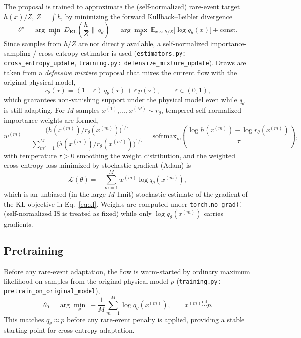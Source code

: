 \documentclass[11pt]{article}
\newcommand{\E}{\mathbb{E}}
\begin{document}
The proposal is trained to approximate the (self-normalized) rare-event
target $h(x)/Z$, $Z = \int h$, by minimizing the forward Kullback--Leibler
divergence
\begin{equation}
\theta^\star
=
\arg\min_\theta \; D_{\mathrm{KL}}\!\left(\frac{h}{Z} \,\Big\|\, q_\theta\right)
=
\arg\max_\theta \; \E_{x \sim h/Z}\big[\log q_\theta(x)\big] + \text{const.}
\label{eq:kl}
\end{equation}
Since samples from $h/Z$ are not directly available, a self-normalized
importance-sampling / cross-entropy estimator is used
(\texttt{estimators.py: cross\_entropy\_update},
\texttt{training.py: defensive\_mixture\_update}). Draws are taken from a
\emph{defensive mixture} proposal that mixes the current flow with the
original physical model,
\begin{equation}
r_\theta(x) = (1-\varepsilon)\, q_\theta(x) + \varepsilon\, p(x),
\qquad \varepsilon \in (0,1),
\label{eq:defensive-mixture}
\end{equation}
which guarantees non-vanishing support under the physical model even while
$q_\theta$ is still adapting. For $M$ samples $x^{(1)},\dots,x^{(M)} \sim
r_\theta$, tempered self-normalized importance weights are formed,
\begin{equation}
w^{(m)}
=
\frac{\big(h(x^{(m)})/r_\theta(x^{(m)})\big)^{1/\tau}}
{\sum_{m'=1}^M \big(h(x^{(m')})/r_\theta(x^{(m')})\big)^{1/\tau}}
=
\mathrm{softmax}_m\!\left(\frac{\log h(x^{(m)}) - \log r_\theta(x^{(m)})}{\tau}\right),
\label{eq:weights}
\end{equation}
with temperature $\tau > 0$ smoothing the weight distribution, and the
weighted cross-entropy loss minimized by stochastic gradient (Adam) is
\begin{equation}
\mathcal L(\theta) = -\sum_{m=1}^M w^{(m)} \log q_\theta(x^{(m)}),
\label{eq:loss}
\end{equation}
which is an unbiased (in the large-$M$ limit) stochastic estimate of the
gradient of the KL objective in Eq.~\eqref{eq:kl}. Weights are computed under
\texttt{torch.no\_grad()} (self-normalized IS is treated as fixed) while only
$\log q_\theta(x^{(m)})$ carries gradients.

\subsection{Pretraining}

Before any rare-event adaptation, the flow is warm-started by ordinary
maximum likelihood on samples from the original physical model $p$
(\texttt{training.py: pretrain\_on\_original\_model}),
\begin{equation}
\theta_0 = \arg\min_\theta \; -\frac1M \sum_{m=1}^M \log q_\theta(x^{(m)}),
\qquad x^{(m)} \overset{\text{iid}}{\sim} p .
\end{equation}
This matches $q_\theta \approx p$ before any rare-event penalty is applied,
providing a stable starting point for cross-entropy adaptation.
\end{document}
